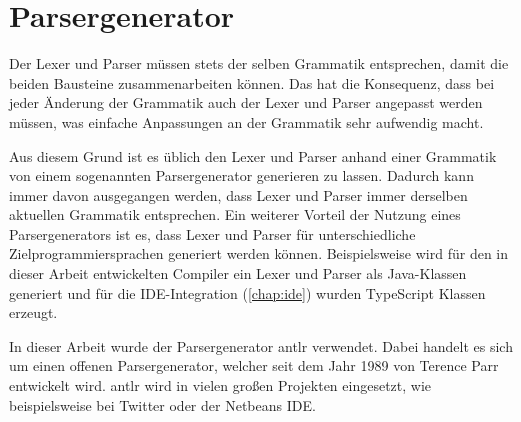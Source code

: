\section{Parsergenerator}
Der Lexer und Parser müssen stets der selben Grammatik entsprechen, damit die beiden Bausteine zusammenarbeiten können. Das hat die Konsequenz, dass bei jeder Änderung der Grammatik auch der Lexer und Parser angepasst werden müssen, was einfache Anpassungen an der Grammatik sehr aufwendig macht.

Aus diesem Grund ist es üblich den Lexer und Parser anhand einer Grammatik von einem sogenannten Parsergenerator generieren zu lassen. Dadurch kann immer davon ausgegangen werden, dass Lexer und Parser immer derselben aktuellen Grammatik entsprechen. Ein weiterer Vorteil der Nutzung eines Parsergenerators ist es, dass Lexer und Parser für unterschiedliche Zielprogrammiersprachen generiert werden können. Beispielsweise wird für den in dieser Arbeit entwickelten Compiler ein Lexer und Parser als Java-Klassen generiert und für die IDE-Integration (\cref{chap:ide})  wurden TypeScript Klassen erzeugt.  

In dieser Arbeit wurde der Parsergenerator \ac{antlr} verwendet. Dabei handelt es sich um einen offenen Parsergenerator, welcher seit dem Jahr 1989 von Terence Parr entwickelt wird. \ac{antlr} wird in vielen großen Projekten eingesetzt, wie beispielsweise bei Twitter oder der Netbeans IDE. \cite{TerenceParr2022}